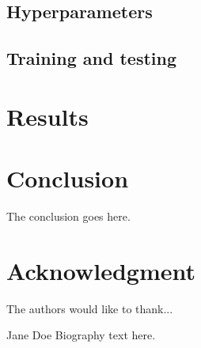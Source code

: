 \documentclass[journal]{IEEEtran}
\begin{document}
\subsection{Hyperparameters}

\subsection{Training and testing}
\section{Results}

\section{Conclusion}
The conclusion goes here.


\section*{Acknowledgment}


The authors would like to thank...







\begin{IEEEbiography}{}
\end{IEEEbiography}

\begin{IEEEbiographynophoto}{}
\end{IEEEbiographynophoto}


\begin{IEEEbiographynophoto}{Jane Doe}
Biography text here.
\end{IEEEbiographynophoto}






\end{document}

